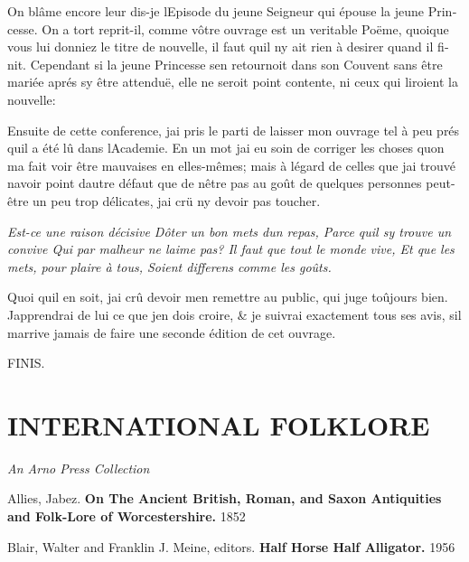 \documentclass[14pt,a4paper]{memoir}
\begin{document}
{{\begin{otherlanguage}{french}
On blâme encore leur dis-je l\textquotesingle Episode du jeune Seigneur
qui épouse la jeune Princesse. On a tort reprit-il, comme vôtre ouvrage
est un veritable Poëme, quoique vous lui donniez le titre de nouvelle,
il faut qu\textquotesingle il n\textquotesingle y ait rien à desirer
quand il finit. Cependant si la jeune Princesse s\textquotesingle en
retournoit dans son Couvent sans être mariée aprés s\textquotesingle y
être attenduë, elle ne seroit point contente, ni ceux qui liroient la
nouvelle:

Ensuite de cette conference, j\textquotesingle ai pris le parti de
laisser mon ouvrage tel à peu prés qu\textquotesingle il a été lû dans
l\textquotesingle Academie. En un mot j\textquotesingle ai eu soin de
corriger les choses qu\textquotesingle on m\textquotesingle a fait voir
être mauvaises en elles-mêmes; mais à l\textquotesingle égard de celles
que j\textquotesingle ai trouvé n\textquotesingle avoir point
d\textquotesingle autre défaut que de n\textquotesingle être pas au goût
de quelques personnes peut-être un peu trop délicates,
j\textquotesingle ai crü n\textquotesingle y devoir pas toucher.

\emph{{Est-ce une raison décisive} {D\textquotesingle ôter un bon mets
d\textquotesingle un repas,} {Parce qu\textquotesingle il
s\textquotesingle y trouve un convive} {Qui par malheur ne
l\textquotesingle aime pas?} {Il faut que tout le monde vive,} {Et que
les mets, pour plaire à tous,} {Soient differens comme les goûts.}}

Quoi qu\textquotesingle il en soit, j\textquotesingle ai crû devoir
m\textquotesingle en remettre au public, qui juge toûjours bien.
J\textquotesingle apprendrai de lui ce que j\textquotesingle en dois
croire, \& je suivrai exactement tous ses avis, s\textquotesingle il
m\textquotesingle arrive jamais de faire une seconde édition de cet
ouvrage.

FINIS.

\end{otherlanguage}

\chapter{INTERNATIONAL
FOLKLORE}

\emph{An Arno Press Collection}

Allies, Jabez. \textbf{On The Ancient British, Roman, and Saxon
Antiquities and Folk-Lore of Worcestershire.} 1852

Blair, Walter and Franklin J. Meine, editors. \textbf{Half Horse Half
Alligator.} 1956

}}
\end{document}
